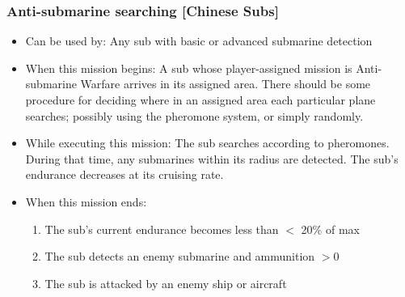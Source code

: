 \documentclass{article}
\begin{document}
    \subsubsection{Anti-submarine searching [Chinese Subs]}
        \begin{itemize}
            \item Can be used by: Any sub with basic or advanced submarine detection
            \item When this mission begins: A sub whose player-assigned mission is Anti-submarine Warfare arrives in its assigned area. There should be some procedure for deciding where in an assigned area each particular plane searches; possibly using the pheromone system, or simply randomly.
            \item While executing this mission: The sub searches according to pheromones. During that time, any submarines within its radius are detected. The sub's endurance decreases at its cruising rate.
            \item When this mission ends:
                \begin{enumerate}[label=\arabic*)]
                    \item The sub's current endurance becomes less than $<$ 20\% of max  \par
                    [Sub mission becomes Transit to Base]
                    \item The sub detects an enemy submarine and ammunition $>0$\par
                    [Sub mission becomes Attacking Submarine]
                    \item The sub is attacked by an enemy ship or aircraft \par
                    [Sub mission becomes Transit to Base]
                \end{enumerate}
        \end{itemize}
\end{document}
